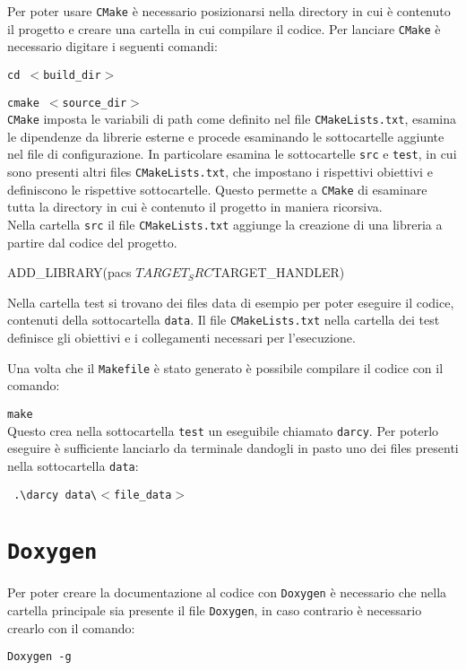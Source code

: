 Per poter usare \texttt{CMake} è necessario posizionarsi nella directory in cui è contenuto il progetto e creare una cartella in cui compilare il codice. Per lanciare \texttt{CMake} è necessario digitare i seguenti comandi: \\ 

\par  \texttt{cd $<$build\_dir$>$ } 
\par \texttt{cmake $<$source\_dir$>$}\\

\noindent \texttt{CMake} imposta le variabili di path come definito nel file  \texttt{CMakeLists.txt}, esamina le dipendenze da librerie esterne e procede esaminando le sottocartelle aggiunte nel file di configurazione. In particolare esamina le sottocartelle \texttt{src} e \texttt{test}, in cui sono presenti altri files  \texttt{CMakeLists.txt}, che impostano i rispettivi obiettivi e definiscono le rispettive sottocartelle. Questo permette a \texttt{CMake} di esaminare tutta la directory in cui è contenuto il progetto in maniera ricorsiva. \\
Nella cartella \texttt{src} il file  \texttt{CMakeLists.txt} aggiunge la creazione di una libreria a partire dal codice del progetto. 
\begin{Code03_01}
ADD_LIBRARY(pacs ${TARGET_SRC} ${TARGET_HANDLER})
\end{Code03_01}

Nella cartella test si trovano dei files data di esempio per poter eseguire il codice, contenuti della sottocartella \texttt{data}. Il file  \texttt{CMakeLists.txt} nella cartella dei test definisce gli obiettivi e i collegamenti necessari per l'esecuzione. 

\par Una volta che il \texttt{Makefile} è stato generato è possibile compilare il codice con il comando: \\ 
\par \texttt{make}\\

\noindent Questo crea nella sottocartella \texttt{test} un eseguibile chiamato \texttt{darcy}. Per poterlo eseguire è sufficiente lanciarlo da terminale dandogli in pasto uno dei files presenti nella sottocartella \texttt{data}:\\
\par \texttt{ .\textbackslash darcy data\textbackslash$<$file\_data$>$ }

\section{\texttt{Doxygen}}
Per poter creare la documentazione al codice con \texttt{Doxygen} è necessario che nella cartella principale sia presente il file \texttt{Doxygen}, in caso contrario è necessario crearlo con il comando:\\
\par \texttt{Doxygen -g}\\

